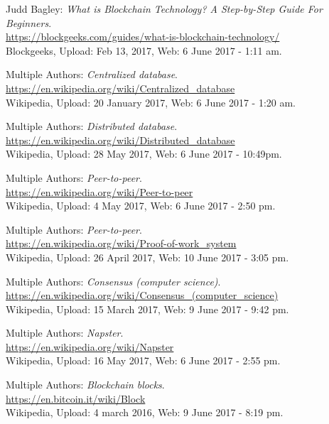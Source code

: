 \documentclass[paper=a4, fontsize=11pt]{scrartcl} %
\numberwithin{equation}{section} %
\numberwithin{figure}{section} %
\numberwithin{table}{section} %
\begin{document}
\begin{thebibliography}{9}
Judd Bagley:
\textit{What is Blockchain Technology? A Step-by-Step Guide For Beginners}. \\ \url{https://blockgeeks.com/guides/what-is-blockchain-technology/} \\Blockgeeks, Upload: Feb 13, 2017, Web: 6 June 2017 - 1:11 am.
 
Multiple Authors:
\textit{Centralized database}.\\
\url{https://en.wikipedia.org/wiki/Centralized_database}\\ 
Wikipedia, Upload: 20 January 2017, Web: 6 June 2017 - 1:20 am.

Multiple Authors:
\textit{Distributed database}.\\
\url{https://en.wikipedia.org/wiki/Distributed_database}\\ 
Wikipedia, Upload: 28 May 2017, Web: 6 June 2017 - 10:49pm.

Multiple Authors:
\textit{Peer-to-peer}.\\
\url{https://en.wikipedia.org/wiki/Peer-to-peer}\\ 
Wikipedia, Upload: 4 May 2017, Web: 6 June 2017 - 2:50 pm.

Multiple Authors:
\textit{Peer-to-peer}.\\
\url{https://en.wikipedia.org/wiki/Proof-of-work_system}\\ 
Wikipedia, Upload: 26 April 2017, Web: 10 June 2017 - 3:05 pm.

Multiple Authors:
\textit{Consensus (computer science)}.\\
\url{https://en.wikipedia.org/wiki/Consensus_(computer_science)}\\ 
Wikipedia, Upload: 15 March 2017, Web: 9 June 2017 - 9:42 pm.

Multiple Authors:
\textit{Napster}.\\
\url{https://en.wikipedia.org/wiki/Napster}\\ 
Wikipedia, Upload: 16 May 2017, Web: 6 June 2017 - 2:55 pm.

Multiple Authors:
\textit{Blockchain blocks}.\\
\url{https://en.bitcoin.it/wiki/Block}\\ 
Wikipedia, Upload: 4 march 2016, Web: 9 June 2017 - 8:19 pm.


\end{thebibliography}
\end{document}
